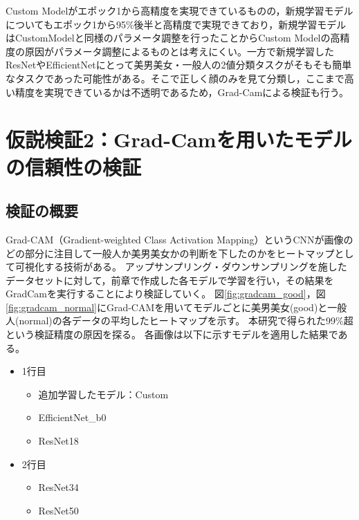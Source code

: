 \documentclass[a4paper,11pt,titlepage]{jsarticle}
\begin{document}

  




Custom Modelがエポック1から高精度を実現できているものの，新規学習モデルについてもエポック1から95\%後半と高精度で実現できており，新規学習モデルはCustomModelと同様のパラメータ調整を行ったことからCustom Modelの高精度の原因がパラメータ調整によるものとは考えにくい。一方で新規学習したResNetやEfficientNetにとって美男美女・一般人の2値分類タスクがそもそも簡単なタスクであった可能性がある。そこで正しく顔のみを見て分類し，ここまで高い精度を実現できているかは不透明であるため，Grad-Camによる検証も行う。



\clearpage

\section{仮説検証2：Grad-Camを用いたモデルの信頼性の検証}
\label{label:仮説検証2}
\subsection{検証の概要}
Grad-CAM（Gradient-weighted Class Activation Mapping）というCNNが画像のどの部分に注目して一般人か美男美女かの判断を下したのかをヒートマップとして可視化する技術がある。
アップサンプリング・ダウンサンプリングを施したデータセットに対して，前章で作成した各モデルで学習を行い，その結果をGradCamを実行することにより検証していく。
図\ref{fig:gradcam_good}，図\ref{fig:gradcam_normal}にGrad-CAMを用いてモデルごとに美男美女(good)と一般人(normal)の各データの平均したヒートマップを示す。
本研究で得られた99\%超という検証精度の原因を探る。
各画像は以下に示すモデルを適用した結果である。
\begin{itemize}
	\item 1行目
	\begin{itemize}
	\item 追加学習したモデル：Custom
	\item EfficientNet\_b0
	\item ResNet18
	\end{itemize}
	\item 2行目
	\begin{itemize}
	\item ResNet34
	\item ResNet50
	\end{itemize}
\end{itemize}
\end{document}
